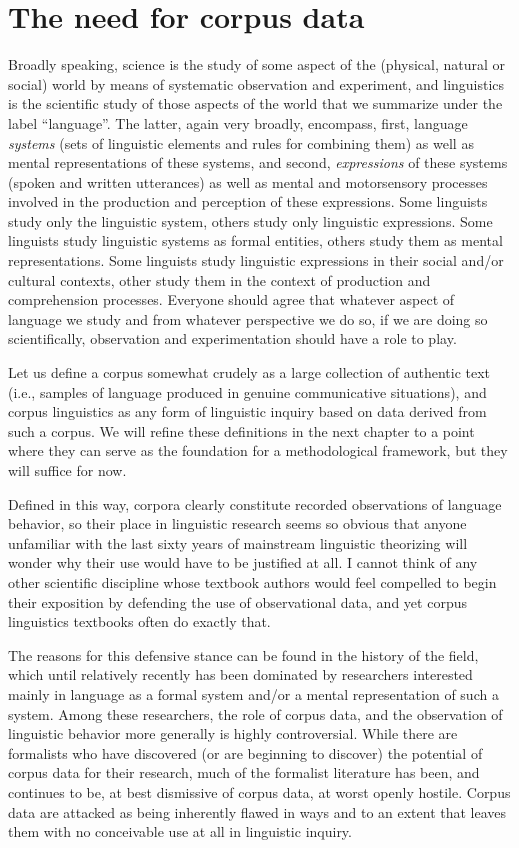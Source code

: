 \chapter{The need for corpus data}
\label{ch:needforcorpus}

Broadly speaking, science is the study of some aspect of the (physical, natural or social) world by means of systematic observation and experiment, and linguistics is the scientific study of those aspects of the world that we summarize under the label ``language''. The latter, again very broadly, encompass, first, language \emph{systems} (sets of linguistic elements and rules for combining them) as well as mental representations of these systems, and second, \emph{expressions} of these systems (spoken and written utterances) as well as mental and motorsensory processes involved in the production and perception of these expressions. Some linguists study only the linguistic system, others study only linguistic expressions. Some linguists study linguistic systems as formal entities, others study them as mental representations. Some linguists study linguistic expressions in their social and/or cultural contexts, other study them in the context of production and comprehension processes. Everyone should agree that whatever aspect of language we study and from whatever perspective we do so, if we are doing so scientifically, observation and experimentation should have a role to play.

Let us define a corpus somewhat crudely as a large collection of authentic text (i.e., samples of language produced in genuine communicative situations), and corpus linguistics as any form of linguistic inquiry based on data derived from such a corpus. We will refine these definitions in the next chapter to a point where they can serve as the foundation for a methodological framework, but they will suffice for now.

Defined in this way, corpora clearly constitute recorded observations of language behavior, so their place in linguistic research seems so obvious that anyone unfamiliar with the last sixty years of mainstream linguistic theorizing will wonder why their use would have to be justified at all. I cannot think of any other scientific discipline whose textbook authors would feel compelled to begin their exposition by defending the use of observational data, and yet corpus linguistics textbooks often do exactly that.

The reasons for this defensive stance can be found in the history of the field, which until relatively recently has been dominated by researchers interested mainly in language as a formal system and/or a mental representation of such a system. Among these researchers, the role of corpus data, and the observation of linguistic behavior more generally is highly controversial. While there are formalists who have discovered (or are beginning to discover) the potential of corpus data for their research, much of the formalist literature has been, and continues to be, at best dismissive of corpus data, at worst openly hostile. Corpus data are attacked as being inherently flawed in ways and to an extent that leaves them with no conceivable use at all in linguistic inquiry.

